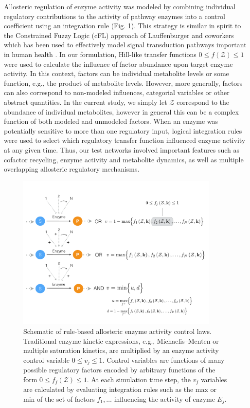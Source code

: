 \documentclass[processes,article,accept,moreauthors,pdftex,12pt,a4paper]{mdpi}
\begin{document}
Allosteric regulation of enzyme activity was modeled by combining individual regulatory contributions to the activity of pathway enzymes into a control coefficient using an integration rule (Fig. \ref{fig-control-schematic}).  
This strategy is similar in spirit to the Constrained Fuzzy Logic (cFL) approach of Lauffenburger and coworkers which has been used to effectively model signal transduction pathways important in human health \citep{Morris:2011aa}. 
In our formulation, Hill-like transfer functions $0 \leq f\left(\mathcal{Z}\right) \leq 1$ were used to calculate the influence of factor abundance upon target enzyme activity. 
In this context, factors can be individual metabolite levels or some function, e.g., the product of metabolite levels. 
However, more generally, factors can also correspond to non-modeled influences, categorial variables or other abstract quantities. 
In the current study, we simply let $\mathcal{Z}$ correspond to the abundance of individual metabolites, however in general this can be a complex function of both modeled and unmodeled factors. 
When an enzyme was potentially sensitive to more than one regulatory input, logical integration rules were used to select which regulatory transfer function influenced enzyme activity at any given time. 
Thus, our test networks involved important features such as cofactor recycling, enzyme activity and metabolite dynamics, as well as multiple overlapping allosteric regulatory mechanisms.  
\begin{figure}[H]
\centering
\includegraphics[width=0.9\textwidth]{./figs/Figure-2-ControlSchematic.pdf}
\caption{Schematic of rule-based allosteric enzyme activity control laws. 
Traditional enzyme kinetic expressions, e.g., Michaelis–Menten or multiple saturation kinetics, are multiplied by an enzyme activity control variable $0 \leq v_{j} \leq 1 $. 
Control variables are functions of many possible regulatory factors encoded by arbitrary functions of the form $0\leq f_{j}\left(\mathcal{Z}\right)\leq 1$.
At each simulation time step, the $v_{j}$ variables are calculated by evaluating integration rules such as the max or min of the set of factors $f_{1},\hdots$ 
influencing the activity of enzyme $E_{j}$. }\label{fig-control-schematic}
\end{figure}
\end{document}
